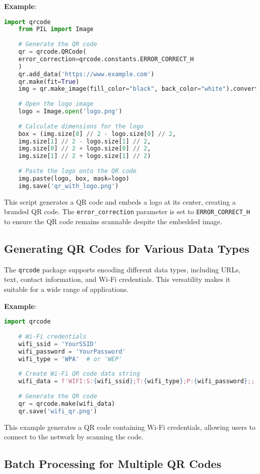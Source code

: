 \textbf{Example}:
\begin{lstlisting}[language=Python]
	import qrcode
	from PIL import Image
	
	# Generate the QR code
	qr = qrcode.QRCode(
	error_correction=qrcode.constants.ERROR_CORRECT_H
	)
	qr.add_data('https://www.example.com')
	qr.make(fit=True)
	img = qr.make_image(fill_color="black", back_color="white").convert('RGB')
	
	# Open the logo image
	logo = Image.open('logo.png')
	
	# Calculate dimensions for the logo
	box = (img.size[0] // 2 - logo.size[0] // 2,
	img.size[1] // 2 - logo.size[1] // 2,
	img.size[0] // 2 + logo.size[0] // 2,
	img.size[1] // 2 + logo.size[1] // 2)
	
	# Paste the logo onto the QR code
	img.paste(logo, box, mask=logo)
	img.save('qr_with_logo.png')
\end{lstlisting}

This script generates a QR code and embeds a logo at its center, creating a branded QR code. The \texttt{error\_correction} parameter is set to \texttt{ERROR\_CORRECT\_H} to ensure the QR code remains scannable despite the embedded image.

\subsection{Generating QR Codes for Various Data Types}

The \texttt{qrcode} package supports encoding different data types, including URLs, text, contact information, and Wi-Fi credentials. This versatility makes it suitable for a wide range of applications.

\textbf{Example}:
\begin{lstlisting}[language=Python]
	import qrcode
	
	# Wi-Fi credentials
	wifi_ssid = 'YourSSID'
	wifi_password = 'YourPassword'
	wifi_type = 'WPA'  # or 'WEP'
	
	# Create Wi-Fi QR code data string
	wifi_data = f'WIFI:S:{wifi_ssid};T:{wifi_type};P:{wifi_password};;'
	
	# Generate the QR code
	qr = qrcode.make(wifi_data)
	qr.save('wifi_qr.png')
\end{lstlisting}

This example generates a QR code containing Wi-Fi credentials, allowing users to connect to the network by scanning the code.\cite{geeksforgeeksqrcode:2023}

\subsection{Batch Processing for Multiple QR Codes}

